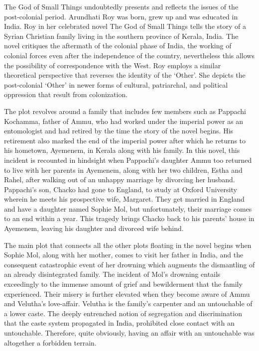 The  God  of  Small  Things  undoubtedly  presents  and  reflects  the  issues  of  the  post-colonial  period.  Arundhati  Roy  was  born,  grew  up  and  was  educated  in  India.  Roy  in  her  celebrated  novel  The  God  of  Small  Things  tells  the  story  of  a  Syrian  Christian  family  living  in  the  southern  province  of  Kerala,  India.  The  novel  critiques  the  aftermath  of  the  colonial  phase  of  India,  the  working  of  colonial  forces  even  after  the  independence  of  the  country,  nevertheless  this  allows  the  possibility  of  correspondence  with  the  West.    Roy  employs  a  similar  theoretical  perspective  that  reverses  the  identity  of  the  ‘Other’.  She  depicts  the  post-colonial  ‘Other’  in  newer  forms  of  cultural,  patriarchal,  and  political  oppression  that  result  from  colonization.

The  plot  revolves  around  a  family  that  includes  few  members  such  as  Pappachi  Kochamma,  father  of  Ammu,  who  had  worked  under  the  imperial  power  as  an  entomologist  and  had  retired  by  the  time  the  story  of  the  novel  begins.  His  retirement  also  marked  the  end  of  the  imperial  power  after  which  he  returns  to  his  hometown,  Ayemenem,  in  Kerala  along  with  his  family.  In  this  novel,  this  incident  is  recounted  in  hindsight  when  Pappachi’s  daughter  Ammu  too  returned  to  live  with  her  parents  in  Ayemenem,  along  with  her  two  children,  Estha  and  Rahel,  after  walking  out  of  an  unhappy  marriage  by  divorcing  her  husband.  Pappachi’s  son,  Chacko  had  gone  to  England,  to  study  at  Oxford  University  wherein  he  meets  his  prospective  wife,  Margaret.  They  get  married  in  England  and  have  a  daughter  named  Sophie  Mol,  but  unfortunately,  their  marriage  comes  to  an  end  within  a  year.  This  tragedy  brings  Chacko  back  to  his  parents’  house  in  Ayemenem,  leaving  his  daughter  and  divorced  wife  behind.

The  main  plot  that  connects  all  the  other  plots  floating  in  the  novel  begins  when  Sophie  Mol,  along  with  her  mother,  comes  to  visit  her  father  in  India,  and  the  consequent  catastrophic  event  of  her  drowning  which  augments  the  dismantling  of  an  already  disintegrated  family.  The  incident  of  Mol’s  drowning  entails  exceedingly  to  the  immense  amount  of  grief  and  bewilderment  that  the  family  experienced.  Their  misery  is  further  elevated  when  they  become  aware  of  Ammu  and  Velutha’s  love-affair.  Velutha  is  the  family’s  carpenter  and  an  untouchable  of  a  lower  caste.  The  deeply  entrenched  notion  of  segregation  and  discrimination  that  the  caste  system  propagated  in  India,  prohibited  close  contact  with  an  untouchable.  Therefore,  quite  obviously,  having  an  affair  with  an  untouchable  was  altogether  a  forbidden  terrain.

